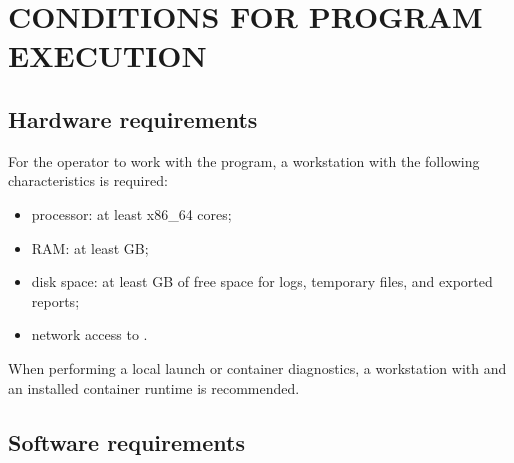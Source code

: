 \documentclass[12pt,a4paper]{extarticle}
\begin{document}
\section{CONDITIONS FOR PROGRAM EXECUTION}

\subsection{Hardware requirements}

\begin{hseExample}
For the operator to work with the program, a workstation with the following characteristics is required:

\begin{itemize}[leftmargin=1.25cm]
    \item processor: at least  x86\_64 cores;
    \item RAM: at least  GB;
    \item disk space: at least  GB of free space for logs, temporary files, and exported reports;
    \item network access to .
\end{itemize}

When performing a local launch or container diagnostics, a workstation with  and an installed container runtime is recommended.
\end{hseExample}

\subsection{Software requirements}
\end{document}
